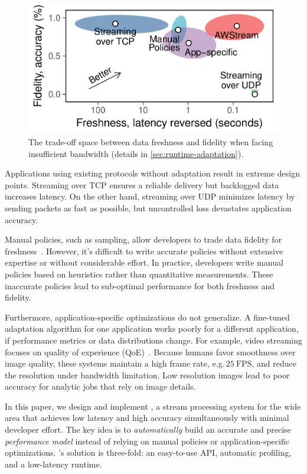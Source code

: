 \begin{figure}
  \centering
  \includegraphics[width=0.8\columnwidth]{figures/figure1.pdf}
  \caption{The trade-off space between data freshness and fidelity when facing
    insufficient bandwidth (details in \autoref{sec:runtime-adaptation}).}
  \label{fig:intro}
  \vspace{-1em}
\end{figure}

Applications using existing protocols without adaptation result in extreme
design points. Streaming over TCP ensures a reliable delivery but backlogged
data increases latency. On the other hand, streaming over UDP minimizes latency
by sending packets as fast as possible, but uncontrolled loss devastates
application accuracy.

Manual policies, such as sampling, allow developers to trade data fidelity for
freshness~\cite{rabkin2014aggregation}. However, it's difficult to write
accurate policies without extensive expertise or without considerable effort. In
practice, developers write manual policies based on heuristics rather than
quantitative measurements. These inaccurate policies lead to sub-optimal
performance for both freshness and fidelity.

Furthermore, application-specific optimizations do not generalize. A fine-tuned
adaptation algorithm for one application works poorly for a different
application, if performance metrics or data distributions change.  For example,
video streaming focuses on quality of experience
(QoE)~\cite{michalos2012dynamic, pantos2016http, yin2015control}. Because humans
favor smoothness over image quality, these systems maintain a high frame rate,
e.g.\,\(25~\text{FPS}\), and reduce the resolution under bandwidth limitation.
Low resolution images lead to poor accuracy for analytic jobs that rely on image
details.

In this paper, we design and implement \sysname{}, a stream processing system
for the wide area that achieves low latency and high accuracy simultaneously
with minimal developer effort. The key idea is to \textit{automatically} build
an accurate and precise \textit{performance model} instead of relying on manual
policies or application-specific optimizations. \sysname{}'s solution is
three-fold: an easy-to-use API, automatic profiling, and a low-latency runtime.

